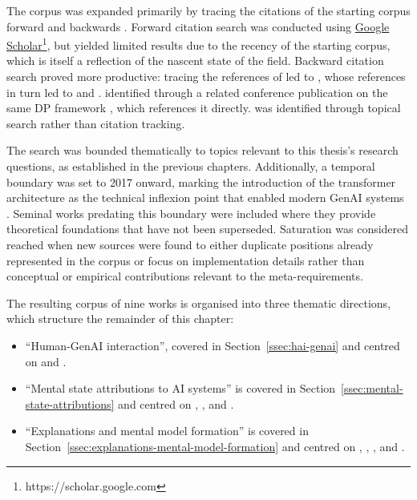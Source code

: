 The corpus was expanded primarily by tracing the citations of the starting corpus forward and backwards \parencite[cf.][]{Boell2014}. Forward citation search was conducted using \href{https://scholar.google.com/}{Google Scholar}\footnote{https://scholar.google.com}, but yielded limited results due to the recency of the starting corpus, which is itself a reflection of the nascent state of the field. Backward citation search proved more productive: tracing the references of \textcite{Ying2024} led to \textcite{Shin2021}, whose references in turn led to \textcite{Arrieta2020} and \textcite{Miller2019}. \textcite{Weisz2025} identified \textcite{Amershi2019} through a related conference publication on the same \ac{DP} framework \parencite{Weisz2024}, which references it directly. \textcite{Hoffman2023} was identified through topical search rather than citation tracking.

The search was bounded thematically to topics relevant to this thesis's research questions, as established in the previous chapters. Additionally, a temporal boundary was set to 2017 onward, marking the introduction of the transformer architecture \parencite{Vaswani2017} as the technical inflexion point that enabled modern \ac{GenAI} systems \parencite{Schneider2024}. Seminal works predating this boundary were included where they provide theoretical foundations that have not been superseded. Saturation was considered reached when new sources were found to either duplicate positions already represented in the corpus or focus on implementation details rather than conceptual or empirical contributions relevant to the meta-requirements.

The resulting corpus of nine works is organised into three thematic directions, which structure the remainder of this chapter:

\begin{itemize}
    \item \enquote{Human-\ac{GenAI} interaction}, covered in Section~\ref{ssec:hai-genai} and centred on \textcite{Weisz2025} and \textcite{Amershi2019}.
    \item \enquote{Mental state attributions to \ac{AI} systems} is covered in Section~\ref{ssec:mental-state-attributions} and centred on \textcite{Jussupow2021}, \textcite{Colombatto2025}, and \textcite{Ying2024}.
    \item \enquote{Explanations and mental model formation} is covered in Section~\ref{ssec:explanations-mental-model-formation} and centred on \textcite{Miller2019}, \textcite{Shin2021}, \textcite{Hoffman2023}, and \textcite{Arrieta2020}.
\end{itemize}

